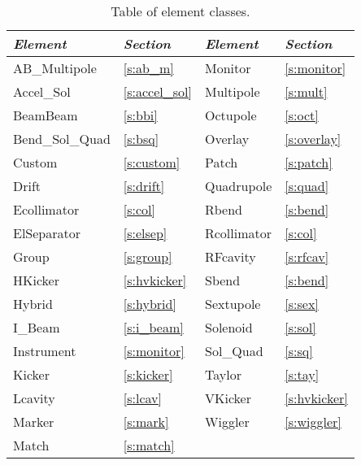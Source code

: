 \begin{table}[h]
\centering
{\tt
\begin{tabular}{|l|l||l|l|} \hline
  {\it Element}   & {\it Section}     & {\it Element} & {\it Section}    \\ \hline
  AB\_Multipole   & \ref{s:ab_m}      &  Monitor      & \ref{s:monitor}  \\ \hline
  Accel\_Sol      & \ref{s:accel_sol} &  Multipole    & \ref{s:mult}     \\ \hline
  BeamBeam        & \ref{s:bbi}       &  Octupole     & \ref{s:oct}      \\ \hline
  Bend\_Sol\_Quad & \ref{s:bsq}       &  Overlay      & \ref{s:overlay}  \\ \hline
  Custom          & \ref{s:custom}    &  Patch        & \ref{s:patch}    \\ \hline
  Drift           & \ref{s:drift}     &  Quadrupole   & \ref{s:quad}     \\ \hline
  Ecollimator     & \ref{s:col}       &  Rbend        & \ref{s:bend}     \\ \hline
  ElSeparator     & \ref{s:elsep}     &  Rcollimator  & \ref{s:col}      \\ \hline
  Group           & \ref{s:group}     &  RFcavity     & \ref{s:rfcav}    \\ \hline
  HKicker         & \ref{s:hvkicker}  &  Sbend        & \ref{s:bend}     \\ \hline
  Hybrid          & \ref{s:hybrid}    &  Sextupole    & \ref{s:sex}      \\ \hline
  I\_Beam         & \ref{s:i_beam}    &  Solenoid     & \ref{s:sol}      \\ \hline
  Instrument      & \ref{s:monitor}   &  Sol\_Quad    & \ref{s:sq}       \\ \hline
  Kicker          & \ref{s:kicker}    &  Taylor       & \ref{s:tay}      \\ \hline
  Lcavity         & \ref{s:lcav}      &  VKicker      & \ref{s:hvkicker} \\ \hline
  Marker          & \ref{s:mark}      &  Wiggler      & \ref{s:wiggler}  \\ \hline
  Match           & \ref{s:match}     &               &                  \\ \hline
  
\end{tabular}
}
\caption{Table of \bmad element classes.}
\label{t:elements}\center
\end{table}

